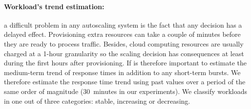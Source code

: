 
\paragraph{Workload's trend estimation:} 
a difficult problem in any autoscaling system is the fact that any
decision has a delayed effect. Provisioning extra resources can take a
couple of minutes before they are ready to process traffic. Besides,
cloud computing resources are usually charged at a 1-hour granularity
so the scaling decision has consequences at least during the first
hours after provisioning. If is therefore important to estimate the
medium-term trend of response times in addition to any short-term
bursts. We therefore estimate the response time trend using past values
over a period of the same order of magnitude (30\ minutes in our
experiments). We classify workloads in one out of three categories:
stable, increasing or decreasing. 


